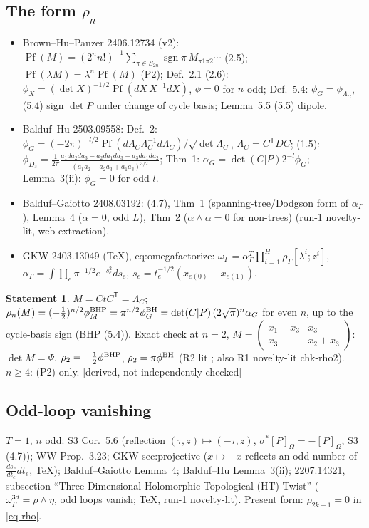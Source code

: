 \documentclass[10pt,a4paper]{article}
\numberwithin{equation}{section}
\theoremstyle{definition}
\newtheorem{dstatement}[theorem]{Statement}
\theoremstyle{remark}
\newcommand{\Pf}{\operatorname{Pf}}
\newcommand{\sgn}{\operatorname{sgn}}
\newcommand{\der}{\textup{[derived, not independently checked]}}
\begin{document}
\subsection{\texorpdfstring{The form $\rho_n$}{The form rho\_n}}
\begin{itemize}\itemsep1pt
\item Brown--Hu--Panzer 2406.12734 (v2): $\Pf(M)=(2^nn!)^{-1}\sum_{\pi\in S_{2n}}\sgn\pi\,M_{\pi1\pi2}\cdots$ (2.5); $\Pf(\lambda M)=\lambda^n\Pf(M)$ (P2); Def.~2.1 (2.6): $\phi_X=(\det X)^{-1/2}\Pf(dX\,X^{-1}dX)$, $\phi=0$ for $n$ odd; Def.~5.4: $\phi_G=\phi_{\Lambda_C}$, (5.4) sign $\det P$ under change of cycle basis; Lemma~5.5 (5.5) dipole.
\item Balduf--Hu 2503.09558: Def.~2: $\phi_G=(-2\pi)^{-l/2}\Pf(d\Lambda_C\Lambda_C^{-1}d\Lambda_C)/\sqrt{\det\Lambda_C}$, $\Lambda_C=C^{\mathsf T}DC$; (1.5): $\phi_{D_3}=\frac1{2\pi}\frac{a_1da_2da_3-a_2da_1da_3+a_3da_1da_2}{(a_1a_2+a_2a_3+a_1a_3)^{3/2}}$; Thm~1: $\alpha_G=\det(C|P)2^{-l}\phi_G$; Lemma~3(ii): $\phi_G=0$ for odd $l$.
\item Balduf--Gaiotto 2408.03192: (4.7), Thm~1 (spanning-tree/Dodgson form of $\alpha_\Gamma$), Lemma~4 ($\alpha=0$, odd $L$), Thm~2 ($\alpha\wedge\alpha=0$ for non-trees) (run-1 novelty-lit, web extraction).
\item GKW 2403.13049 (TeX), eq:omegafactorize: $\omega_\Gamma=\alpha_\Gamma^T\prod_{i=1}^H\rho_\Gamma[\lambda^i;z^i]$, $\alpha_\Gamma=\int\prod_e\pi^{-1/2}e^{-s_e^2}ds_e$, $s_e=t_e^{-1/2}(x_{e(0)}-x_{e(1)})$.
\end{itemize}
\begin{dstatement}
$M=CtC^{\mathsf T}=\Lambda_C$; $\rho_n(M)=(-\frac12)^{n/2}\phi^{\rm BHP}_M=\pi^{n/2}\phi^{\rm BH}_G=\det(C|P)\,(2\sqrt\pi)^n\alpha_G$ for even $n$, up to the cycle-basis sign (BHP (5.4)). Exact check at $n=2$, $M=\begin{pmatrix}x_1+x_3&x_3\\x_3&x_2+x_3\end{pmatrix}$: $\det M=\Psi$, $\rho_2=-\frac12\phi^{\rm BHP}$, $\rho_2=\pi\phi^{\rm BH}$ (R2 lit ; also R1 novelty-lit chk-rho2). $n\ge4$: (P2) only. \der
\end{dstatement}

\subsection{Odd-loop vanishing}
$T=1$, $n$ odd: S3 Cor.~5.6 (reflection $(\tau,z)\mapsto(-\tau,z)$, $\sigma^*[P]_\Omega=-[P]_\Omega$, S3 (4.7)); WW Prop.~3.23; GKW sec:projective ($x\mapsto-x$ reflects an odd number of $\frac{ds_e}{dt_e}dt_e$, TeX); Balduf--Gaiotto Lemma~4; Balduf--Hu Lemma~3(ii); 2207.14321, subsection ``Three-Dimensional Holomorphic-Topological (HT) Twist'' ($\omega^{3d}_\Gamma=\rho\wedge\eta$, odd loops vanish; TeX, run-1 novelty-lit). Present form: $\rho_{2k+1}=0$ in \eqref{eq-rho}.
\end{document}
